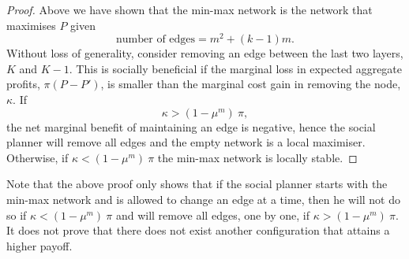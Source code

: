 \documentclass[american, abstract=on]{scrartcl}
\theoremstyle{plain}
\begin{document}
\begin{proof}
    Above we have shown that the min-max network is the network that maximises $P$ given \begin{equation}
        \text{number of edges} = m^2 + (k - 1) m.
    \end{equation}
    Without loss of generality, consider removing an edge between the last two layers, $K$ and $K - 1$. This is socially beneficial if the marginal loss in expected aggregate profits, $\pi (P - P')$, is smaller than the marginal cost gain in removing the node, $\kappa$. If \begin{equation}
        \kappa > (1 - \mu^m) \ \pi,
    \end{equation} the net marginal benefit of maintaining an edge is negative, hence the social planner will remove all edges and the empty network is a local maximiser. Otherwise, if $\kappa < (1 - \mu^m) \ \pi$ the min-max network is locally stable. 
\end{proof}

Note that the above proof only shows that if the social planner starts with the min-max network and is allowed to change an edge at a time, then he will not do so if $\kappa < (1 - \mu^m) \ \pi$ and will remove all edges, one by one, if $\kappa > (1 - \mu^m) \ \pi$. It does not prove that there does not exist another configuration that attains a higher payoff. 
\end{document}
